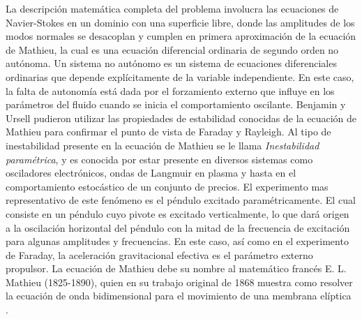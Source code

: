 La descripción matemática completa del problema involucra las ecuaciones de Navier-Stokes en un dominio con una superficie libre, donde las amplitudes de los modos normales se desacoplan y cumplen en primera aproximación de la ecuación de Mathieu, la cual es una ecuación diferencial ordinaria de segundo orden no autónoma. Un sistema no autónomo es un sistema de ecuaciones diferenciales ordinarias que depende explícitamente de la variable independiente. En este caso, la falta de autonomía está dada por el forzamiento externo que influye en los parámetros del fluido cuando se inicia el comportamiento oscilante. Benjamin y Ursell pudieron utilizar las propiedades de estabilidad conocidas de la ecuación de Mathieu para confirmar el punto de vista de Faraday y Rayleigh. Al tipo de inestabilidad presente en la ecuación de Mathieu se le llama \textit{Inestabilidad paramétrica}, y es conocida por estar presente en diversos sistemas como osciladores electrónicos, ondas de Langmuir en plasma y hasta en el comportamiento estocástico de un conjunto de precios. El experimento mas representativo de este fenómeno es el péndulo excitado paramétricamente. El cual consiste en un péndulo cuyo pivote es excitado verticalmente, lo que dará origen a la oscilación horizontal del péndulo con la mitad de la frecuencia de excitación para algunas amplitudes y frecuencias. En este caso, así como en el experimento de Faraday, la aceleración gravitacional efectiva es el parámetro externo propulsor. La ecuación de Mathieu debe su nombre al matemático francés E. L. Mathieu (1825-1890), quien en su trabajo original de 1868 muestra como resolver la ecuación de onda bidimensional para el movimiento de una membrana elíptica \cite{Mathieu1868}.\medskip

